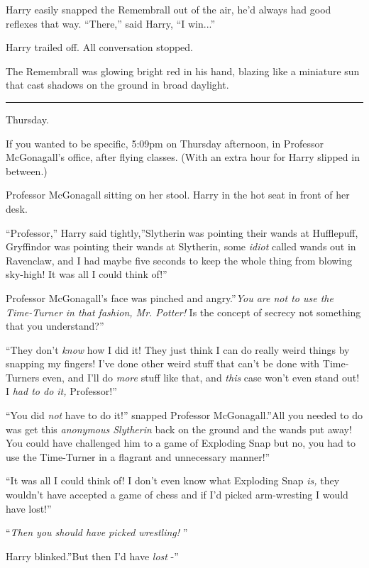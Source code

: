 Harry easily snapped the Remembrall out of the air, he'd always had good
reflexes that way. ``There,'' said Harry, ``I win...''

Harry trailed off. All conversation stopped.

The Remembrall was glowing bright red in his hand, blazing like a
miniature sun that cast shadows on the ground in broad daylight.

\begin{center}\rule{3in}{0.4pt}\end{center}

Thursday.

If you wanted to be specific, 5:09pm on Thursday afternoon, in Professor
McGonagall's office, after flying classes. (With an extra hour for Harry
slipped in between.)

Professor McGonagall sitting on her stool. Harry in the hot seat in
front of her desk.

``Professor,'' Harry said tightly,''Slytherin was pointing their wands
at Hufflepuff, Gryffindor was pointing their wands at Slytherin, some
\emph{idiot} called wands out in Ravenclaw, and I had maybe five seconds
to keep the whole thing from blowing sky-high! It was all I could think
of!''

Professor McGonagall's face was pinched and angry.''\emph{You are not to
use the Time-Turner in that fashion, Mr. Potter!} Is the concept of
secrecy not something that you understand?''

``They don't \emph{know} how I did it! They just think I can do really
weird things by snapping my fingers! I've done other weird stuff that
can't be done with Time-Turners even, and I'll do \emph{more} stuff like
that, and \emph{this} case won't even stand out! I \emph{had to do it,}
Professor!''

``You did \emph{not} have to do it!'' snapped Professor McGonagall.''All
you needed to do was get this \emph{anonymous Slytherin} back on the
ground and the wands put away! You could have challenged him to a game
of Exploding Snap but no, you had to use the Time-Turner in a flagrant
and unnecessary manner!''

``It was all I could think of! I don't even know what Exploding Snap
\emph{is,} they wouldn't have accepted a game of chess and if I'd picked
arm-wresting I would have lost!''

``\emph{Then you should have picked wrestling!} ''

Harry blinked.''But then I'd have \emph{lost} -''


